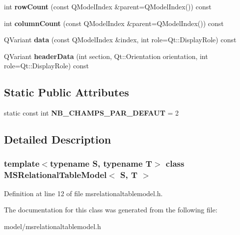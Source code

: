 \begin{DoxyCompactItemize}
\item 
\hypertarget{class_m_s_relational_table_model_af5595dbe07ba68a5828f171111cdf2d1}{
int {\bfseries rowCount} (const QModelIndex \&parent=QModelIndex()) const }
\label{class_m_s_relational_table_model_af5595dbe07ba68a5828f171111cdf2d1}

\item 
\hypertarget{class_m_s_relational_table_model_a5d37089874a8e6f8cd2a3c1cab025e13}{
int {\bfseries columnCount} (const QModelIndex \&parent=QModelIndex()) const }
\label{class_m_s_relational_table_model_a5d37089874a8e6f8cd2a3c1cab025e13}

\item 
\hypertarget{class_m_s_relational_table_model_a2270ae1330105c3b514a474c287b9bbb}{
QVariant {\bfseries data} (const QModelIndex \&index, int role=Qt::DisplayRole) const }
\label{class_m_s_relational_table_model_a2270ae1330105c3b514a474c287b9bbb}

\item 
\hypertarget{class_m_s_relational_table_model_a1e546f090a9e1148a25fdc1168d7169b}{
QVariant {\bfseries headerData} (int section, Qt::Orientation orientation, int role=Qt::DisplayRole) const }
\label{class_m_s_relational_table_model_a1e546f090a9e1148a25fdc1168d7169b}

\end{DoxyCompactItemize}
\subsection*{Static Public Attributes}
\begin{DoxyCompactItemize}
\item 
\hypertarget{class_m_s_relational_table_model_a97fb315a0bf3ed288aca077576ab16f6}{
static const int {\bfseries NB\_\-CHAMPS\_\-PAR\_\-DEFAUT} = 2}
\label{class_m_s_relational_table_model_a97fb315a0bf3ed288aca077576ab16f6}

\end{DoxyCompactItemize}


\subsection{Detailed Description}
\subsubsection*{template$<$typename S, typename T$>$ class MSRelationalTableModel$<$ S, T $>$}



Definition at line 12 of file msrelationaltablemodel.h.



The documentation for this class was generated from the following file:\begin{DoxyCompactItemize}
\item 
model/msrelationaltablemodel.h\end{DoxyCompactItemize}

